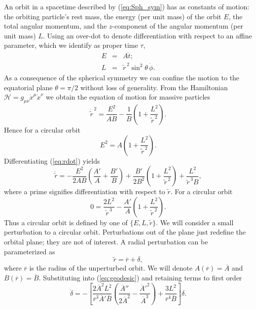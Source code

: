 \documentclass[aps,prd,amsfonts,amssymb,amsmath,nofootinbib,reprint,showpacs]{revtex4-1}
\newcommand{\eqnref}[1]{(\ref{eq:#1})}
\newcommand{\recip}[1]{\ensuremath{\frac{1}{#1}}}
\begin{document}
An orbit in a spacetime described by \eqnref{Sph_sym} has as constants of motion: the orbiting particle's rest mass, the energy (per unit mass) of the orbit $E$, the total angular momentum, and the $z$-component of the angular momentum (per unit mass) $L$. Using an over-dot to denote differentiation with respect to an affine parameter, which we identify as proper time $\tau$,
\begin{eqnarray}
E & = & A\dot{t}; \\
L & = & \widetilde{r}^{\,2}\sin^2\theta\, \dot{\phi}.
\end{eqnarray}
As a consequence of the spherical symmetry we can confine the motion to the equatorial plane $\theta = \pi/2$ without loss of generality. From the Hamiltonian $\mathcal{H} = g_{\mu\nu}\dot{x}^\mu\dot{x}^\nu$ we obtain the equation of motion for massive particles
\begin{equation}
\dot{\widetilde{r}}^{\,2} = \frac{E^2}{AB} - \recip{B}\left(1 + \frac{L^2}{\widetilde{r}^{\,2}}\right).
\label{eq:rdot}
\end{equation}
Hence for a circular orbit
\begin{equation}
E^2 = A\left(1 + \frac{L^2}{\widetilde{r}^{\,2}}\right).
\end{equation}
Differentiating \eqnref{rdot} yields
\begin{equation}
\ddot{\widetilde{r}} = -\frac{E^2}{2AB}\left(\frac{A'}{A} + \frac{B'}{B}\right) + \frac{B'}{2B^2}\left(1 + \frac{L^2}{\widetilde{r}^{\,2}}\right) + \frac{L^2}{\widetilde{r}^{\,3}B},
\label{eq:geodesic}
\end{equation}
where a prime signifies differentiation with respect to $\widetilde{r}$. For a circular orbit
\begin{equation}
0 = \frac{2L^2}{\widetilde{r}^{\,3}} - \frac{A'}{A}\left(1 + \frac{L^2}{\widetilde{r}^{\,2}}\right).
\end{equation}
Thus a circular orbit is defined by one of $\{E,L,\widetilde{r}\}$. We will consider a small perturbation to a circular orbit. Perturbations out of the plane just redefine the orbital plane; they are not of interest. A radial perturbation can be parameterized as
\begin{equation}
\widetilde{r} = \overline{r} + \delta,
\end{equation}
where $\overline{r}$ is the radius of the unperturbed orbit. We will denote $A(\overline{r}) = \overline{A}$ and $B(\overline{r}) = \overline{B}$. Substituting into \eqnref{geodesic} and retaining terms to first order
\begin{equation}
\ddot{\delta} = - \left[\frac{2\overline{A}^2L^2}{\overline{r}^3\overline{A}'\overline{B}}\left(\frac{\overline{A}''}{2\overline{A}^2} - \frac{{\overline{A}'}^2}{\overline{A}^3}\right) + \frac{3L^2}{\overline{r}^4\overline{B}}\right]\delta.
\end{equation}
\end{document}
